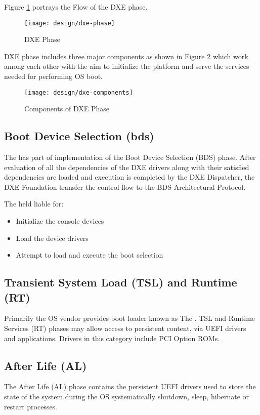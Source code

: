 Figure \ref{fig:dxe-phase} portrays the Flow of the DXE phase.

\begin{figure}[!htbp]
	\centering
	\texttt{[image: design/dxe-phase]}
	\caption{DXE Phase}\label{fig:dxe-phase}
\end{figure}

DXE phase includes three major components as shown in Figure \ref{fig:dxe-components} which work among each other with the aim to initialize the platform and serve the services needed for performing OS boot.


\begin{figure}[!htbp]
	\centering
	\texttt{[image: design/dxe-components]}
	\caption{Components of DXE Phase}\label{fig:dxe-components}
\end{figure}


\subsection{Boot Device Selection (\gls{bds})}
The  has part of implementation of the Boot Device Selection (BDS) phase. After evaluation of all the dependencies of the DXE drivers along with their satisfied dependencies are loaded and execution is completed by the DXE Dispatcher, the DXE Foundation transfer the control flow to the BDS Architectural Protocol.

The  held liable for:
\begin{itemize}
	\item Initialize the console devices
	\item Load the device drivers
	\item Attempt to load and execute the boot selection
\end{itemize}

\subsection{Transient System Load (TSL) and Runtime (RT)}
Primarily the OS vendor provides boot loader known as The . TSL and Runtime Services (RT) phases may allow access to persistent content, via UEFI drivers and applications. Drivers in this category include PCI Option ROMs.

\subsection{After Life (AL)}
The After Life (AL) phase contains the persistent UEFI drivers used to store the state of the system during the OS systematically shutdown, sleep, hibernate or restart processes.
